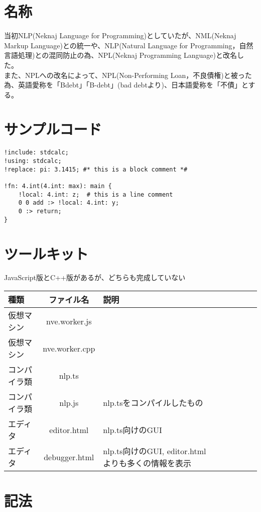 \section{名称}
当初NLP(Neknaj Language for Programming)としていたが、NML(Neknaj Markup Language)との統一や、NLP(Natural Language for Programming，自然言語処理)との混同防止の為、NPL(Neknaj Programming Language)と改名した。\\
また、NPLへの改名によって、NPL(Non-Performing Loan，不良債権)と被った為、英語愛称を「Bdebt」「B-debt」(bad debtより)、日本語愛称を「不債」とする。

\section{サンプルコード}
\begin{lstlisting}[]
!include: stdcalc;
!using: stdcalc;
!replace: pi: 3.1415; #* this is a block comment *#

!fn: 4.int(4.int: max): main {
    !local: 4.int: z;  # this is a line comment
    0 0 add :> !local: 4.int: y;
    0 :> return;
}
\end{lstlisting}

\section{ツールキット}
JavaScript版とC++版があるが、どちらも完成していない
\begin{table}[h]
    \centering
    \begin{tabular}{lcllllll}
        \hline
        種類 & ファイル名 & 説明 \\
        \hline \hline
        仮想マシン & nve.worker.js \\
        仮想マシン & nve.worker.cpp \\
        \hline
        コンパイラ類 & nlp.ts \\
        コンパイラ類 & nlp.js & nlp.tsをコンパイルしたもの \\
        \hline
        エディタ & editor.html & nlp.ts向けのGUI \\
        エディタ & debugger.html & nlp.ts向けのGUI, editor.htmlよりも多くの情報を表示 \\
        \hline
    \end{tabular}
\end{table}


\section{記法}

